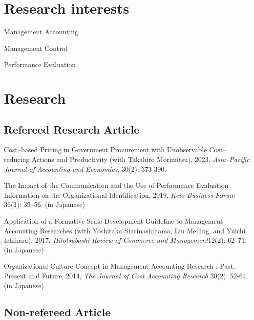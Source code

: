 \documentclass[letterpaper,uplatex]{article}
\renewenvironment{itemize}{
  \begin{list}{}{
    \setlength{\leftmargin}{1.5em}
  }
}{
  \end{list}
}
\begin{document}
\section*{Research interests}

\begin{itemize}
  \item Management Accounting
  \item Management Control
  \item Performance Evaluation
\end{itemize}

\section*{Research}

\subsection*{Refereed Research Article}

\begin{itemize}
    \item Cost--based Pricing in Government Procurement with Unobservable Cost--reducing Actions and Productivity (with Takahiro Morimitsu), 2023, \textit{Asia--Pacific Journal of Accounting and Economics}, 30(2): 373-390.
    
    \item The Impact of the Communication and the Use of Performance Evaluation Information on the Organizational Identification, 2019, \textit{Keio Business Forum} 36(1): 39--56. (in Japanese)

	\item Application of a Formative Scale Development Guideline to Management Accounting Researches (with Yoshitaka Shirinashihama, Liu Meiling, and Yuichi Ichihara), 2017, \textit{Hitotsubashi Review of Commerce and Management}12(2): 62--71. (in Japanese)

	\item Organizational Culture Concept in Management Accounting Research : Past, Present and Future, 2014, \textit{The Journal of Cost Accounting Research} 30(2): 52-64. (in Japanese)
\end{itemize}

\subsection*{Non-refereed Article}
\end{document}
